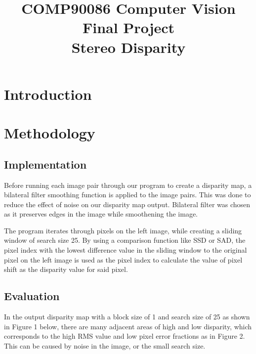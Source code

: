 \documentclass[conference]{IEEEtran}
\begin{document}
\title{COMP90086 Computer Vision Final Project\\
Stereo Disparity
}
\author{
\and
{}
}
\maketitle
\section{Introduction}
\section{Methodology}
\subsection{Implementation}
Before running each image pair through our program to create a disparity map, a bilateral filter smoothing function is applied to the image pairs. This was done to reduce the effect of noise on our disparity map output. Bilateral filter was chosen as it preserves edges in the image while smoothening the image.

The program iterates through pixels on the left image, while creating a sliding window of search size 25. By using a comparison function like SSD or SAD, the pixel index with the lowest difference value in the sliding window to the original pixel on the left image is used as the pixel index to calculate the value of pixel shift as the disparity value for said pixel.

\subsection{Evaluation}
In the output disparity map with a block size of 1 and search size of 25 as shown in Figure 1 below, there are many adjacent areas of high and low disparity, which corresponds to the high RMS value and low pixel error fractions as in Figure 2. This can be caused by noise in the image, or the small search size.
\end{document}

